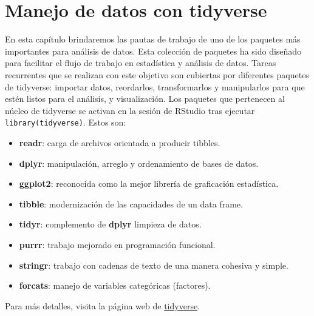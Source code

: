 \documentclass[
]{article}
\providecommand{\tightlist}{%
  \setlength{\itemsep}{0pt}\setlength{\parskip}{0pt}}
\theoremstyle{definition}
\theoremstyle{definition}
\theoremstyle{definition}
\theoremstyle{definition}
\theoremstyle{remark}
\begin{document}
\hypertarget{tidyversecap}{%
\section{\texorpdfstring{\textbf{Manejo de datos con} \textbf{tidyverse}}{Manejo de datos con tidyverse}}\label{tidyversecap}}

En esta capítulo brindaremos las pautas de trabajo de uno de los paquetes más importantes para análisis de datos. Esta colección de paquetes ha sido diseñado para facilitar el flujo de trabajo en estadística y análisis de datos. Tareas recurrentes que se realizan con este objetivo son cubiertas por diferentes paquetes de tidyverse: importar datos, reordarlos, transformarlos y manipularlos para que estén listos para el análisis, y visualización. Los paquetes que pertenecen al núcleo de tidyverse se activan en la sesión de RStudio tras ejecutar \texttt{library(tidyverse)}. Estos son:

\begin{itemize}
\tightlist
\item
  \textbf{readr}: carga de archivos orientada a producir tibbles.
\item
  \textbf{dplyr}: manipulación, arreglo y ordenamiento de bases de datos.
\item
  \textbf{ggplot2}: reconocida como la mejor librería de graficación estadística.
\item
  \textbf{tibble}: modernización de las capacidades de un data frame.
\item
  \textbf{tidyr}: complemento de \textbf{dplyr} limpieza de datos.
\item
  \textbf{purrr}: trabajo mejorado en programación funcional.
\item
  \textbf{stringr}: trabajo con cadenas de texto de una manera cohesiva y simple.
\item
  \textbf{forcats}: manejo de variables categóricas (factores).
\end{itemize}

Para más detalles, visita la página web de \href{https://www.tidyverse.org/packages/}{tidyverse}.
\end{document}
